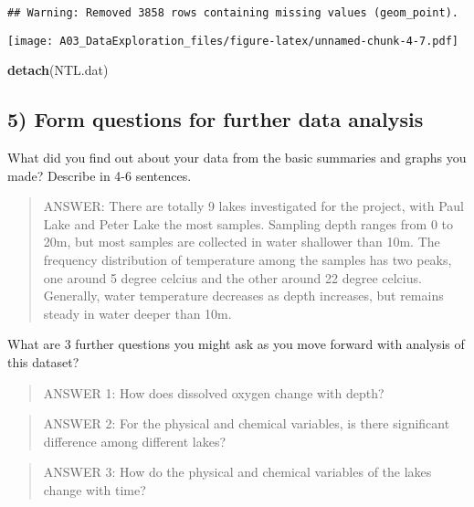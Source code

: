 \documentclass[]{article}
\newenvironment{Shaded}{\begin{snugshade}}{\end{snugshade}}
\newcommand{\KeywordTok}[1]{\textcolor[rgb]{0.13,0.29,0.53}{\textbf{#1}}}
\newcommand{\NormalTok}[1]{#1}
\begin{document}
\begin{verbatim}
## Warning: Removed 3858 rows containing missing values (geom_point).
\end{verbatim}

\texttt{[image: A03\_DataExploration\_files/figure-latex/unnamed-chunk-4-7.pdf]}

\begin{Shaded}
\begin{Highlighting}[]
\KeywordTok{detach}\NormalTok{(NTL.dat)}
\end{Highlighting}
\end{Shaded}

\subsection{5) Form questions for further data
analysis}\label{form-questions-for-further-data-analysis}

What did you find out about your data from the basic summaries and
graphs you made? Describe in 4-6 sentences.

\begin{quote}
ANSWER: There are totally 9 lakes investigated for the project, with
Paul Lake and Peter Lake the most samples. Sampling depth ranges from 0
to 20m, but most samples are collected in water shallower than 10m. The
frequency distribution of temperature among the samples has two peaks,
one around 5 degree celcius and the other around 22 degree celcius.
Generally, water temperature decreases as depth increases, but remains
steady in water deeper than 10m.
\end{quote}

What are 3 further questions you might ask as you move forward with
analysis of this dataset?

\begin{quote}
ANSWER 1: How does dissolved oxygen change with depth?
\end{quote}

\begin{quote}
ANSWER 2: For the physical and chemical variables, is there significant
difference among different lakes?
\end{quote}

\begin{quote}
ANSWER 3: How do the physical and chemical variables of the lakes change
with time?
\end{quote}
\end{document}
